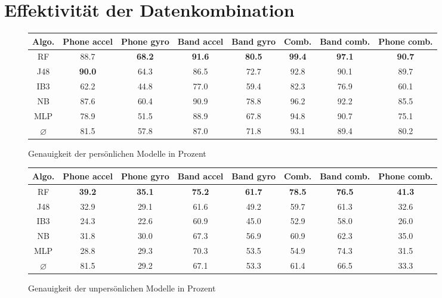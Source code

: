 \section{Effektivität der Datenkombination}
\begin{figure}
\centering
\begin{tabular}{|c|c|c|c|c|c|c|c|}
	\hline 
	\textbf{Algo.} & \textbf{Phone accel} & \textbf{Phone gyro} & \textbf{Band accel} & \textbf{Band gyro} & \textbf{Comb.} & \textbf{Band comb.} & \textbf{Phone comb.} \\ 
	\hline 
	RF & 88.7 & \textbf{68.2} & \textbf{91.6} & \textbf{80.5} & \textbf{99.4} & \textbf{97.1} & \textbf{90.7} \\ 
	J48 & \textbf{90.0} & 64.3 & 86.5 & 72.7 & 92.8 & 90.1 & 89.7 \\ 
	IB3 & 62.2 & 44.8 & 77.0 & 59.4 & 82.3 & 76.9 & 60.1 \\ 
	NB & 87.6 & 60.4 & 90.9 & 78.8 & 96.2 & 92.2 & 85.5 \\ 
	MLP & 78.9 & 51.5 & 88.9 & 67.8 & 94.8 & 90.7 & 75.1 \\ 
	\hline 
	$\varnothing$ & 81.5 & 57.8 & 87.0 & 71.8 & 93.1 & 89.4 & 80.2 \\ 
	\hline 
\end{tabular}
\caption{Genauigkeit der persönlichen Modelle in Prozent}
\label{fig:accuracy-personal}
\end{figure}

\begin{figure}
\centering
\begin{tabular}{|c|c|c|c|c|c|c|c|}
	\hline 
	\textbf{Algo.} & \textbf{Phone accel} & \textbf{Phone gyro} & \textbf{Band accel} & \textbf{Band gyro} & \textbf{Comb.} & \textbf{Band comb.} & \textbf{Phone comb.} \\ 
	\hline 
	RF & \textbf{39.2} & \textbf{35.1} & \textbf{75.2} & \textbf{61.7} & \textbf{78.5} & \textbf{76.5} & \textbf{41.3} \\ 
	J48 & 32.9 & 29.1 & 61.6 & 49.2 & 59.7 & 61.3 & 32.6 \\ 
	IB3 & 24.3 & 22.6 & 60.9 & 45.0 & 52.9 & 58.0 & 26.0 \\ 
	NB & 31.8 & 30.0 & 67.3 & 56.9 & 60.9 & 62.3 & 35.0 \\ 
	MLP & 28.8 & 29.3 & 70.3 & 53.5 & 54.9 & 74.3 & 31.5 \\ 
	\hline 
	$\varnothing$ & 81.5 & 29.2 & 67.1 & 53.3 & 61.4 & 66.5 & 33.3 \\ 
	\hline 
\end{tabular} 
\caption{Genauigkeit der unpersönlichen Modelle in Prozent}
\label{fig:accuracy-impersonal}
\end{figure}

